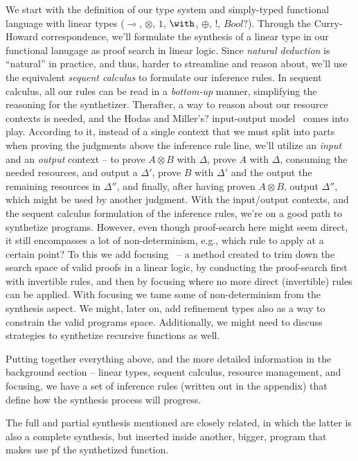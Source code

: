 \documentclass{llncs}
\newcommand{\lolli}{\multimap}
\newcommand{\tensor}{\otimes}
\newcommand{\bang}{{!}}
\begin{document}
We start with the definition of our type system and simply-typed functional language
with linear types ($\lolli$, $\tensor$, $1$, $\with$, $\oplus$, $\bang$, $Bool?$).
Through the Curry-Howard correspondence, we'll formulate the synthesis of a
linear type in our functional lanugage as proof search in linear logic.
Since \emph{natural deduction} is ``natural'' in practice, and thus, harder to streamline and reason about,
we'll use the equivalent \emph{sequent calculus} to formulate our inference rules.
In sequent calculus, all our rules can be read in a \emph{bottom-up} manner, simplifying the reasoning for the synthetizer.
Therafter, a way to reason about our resource contexts is needed, and the Hodas and Miller's? input-output model~\cite{} comes into play.
According to it, instead of a single context that we must split into parts when proving the judgments
above the inference rule line, we'll utilize an \emph{input} and an \emph{output} context -- to prove $A\tensor B$ with $\Delta$, prove $A$ with $\Delta$, consuming the needed resources, and output a $\Delta'$, prove $B$ with $\Delta'$ and the output the remaining resources in $\Delta''$, and finally, after having proven $A\tensor B$, output $\Delta''$, which might be used by another judgment.
With the input/output contexts, and the sequent calculus formulation of the inference rules, we're on a good path to synthetize programs.
However, even though proof-search here might seem direct, it still encompasses a lot of non-determinism, e.g., which rule to apply at a certain point?
To this we add focusing~\cite{} -- a method created to trim down the search space of valid proofs in a linear logic, by conducting the
proof-search first with invertible rules, and then by focusing where no more direct (invertible) rules can be applied.
With focusing we tame some of non-determinism from the synthesis aspect. 
We might, later on, add refinement types also as a way to constrain the valid programs space.
Additionally, we might need to discuss strategies to synthetize recursive functions as well.

Putting together everything above, and the more detailed information in the background section -- linear types, sequent calculus, resource management, and focusing,
we have a set of inference rules (written out in the appendix) that define how the synthesis process will progress.

The full and partial synthesis mentioned are closely related, in which the latter is also a complete synthesis, but inserted inside another, bigger, program that makes use pf the synthetized function.
\end{document}
